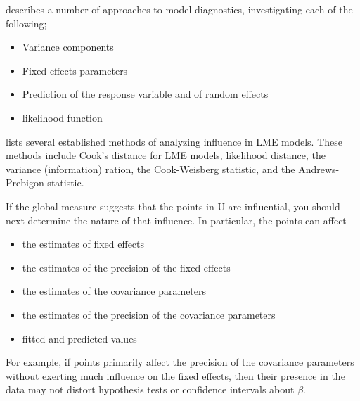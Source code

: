 \documentclass[12pt, a4paper]{report}
\theoremstyle{plain}
\theoremstyle{definition}
\theoremstyle{remark}
\begin{document}
		
	\citet{Zewotir} describes a number of approaches to model diagnostics, investigating each of the following;
	\begin{itemize}
		\item Variance components
		\item Fixed effects parameters
		\item Prediction of the response variable and of random effects
		\item likelihood function
	\end{itemize}

	
	
	\citet{Zewotir} lists several established methods of analyzing influence in LME models. These methods include Cook's distance for LME models,
 likelihood distance,
 the variance (information) ration,
the  Cook-Weisberg statistic, and
the  Andrews-Prebigon statistic.

	If the global measure suggests that the points in U are influential, you should next determine the nature of
	that influence. In particular, the points can affect
	\begin{itemize}
		\item the estimates of fixed effects
		\item the estimates of the precision of the fixed effects
		\item the estimates of the covariance parameters
		\item the estimates of the precision of the covariance parameters
		\item fitted and predicted values
	\end{itemize}	
	
	For example, if points primarily affect the precision of the covariance parameters without exerting much influence on the fixed effects, then their presence in the data may not distort hypothesis
	tests or confidence intervals about $\beta$.
	
	
	
\end{document}
